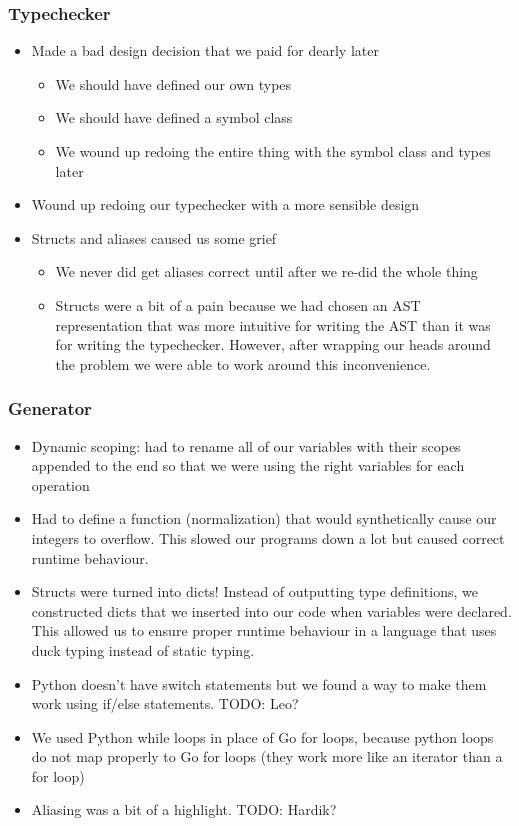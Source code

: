 \documentclass{article}
\begin{document}
\subsubsection{Typechecker}
\begin{itemize}
\item Made a bad design decision that we paid for dearly later
	\begin{itemize}
		\item We should have defined our own types
		\item We should have defined a symbol class
		\item We wound up redoing the entire thing with the symbol class and types later
	\end{itemize}
\item Wound up redoing our typechecker with a more sensible design
\item Structs and aliases caused us some grief
	\begin{itemize}
		\item We never did get aliases correct until after we re-did the whole thing
		\item Structs were a bit of a pain because we had chosen an AST representation that was more intuitive for writing the AST than it was for writing the typechecker. However, after wrapping our heads around the problem we were able to work around this inconvenience.
	\end{itemize}
\end{itemize}
\subsubsection{Generator}
\begin{itemize}
\item Dynamic scoping: had to rename all of our variables with their scopes appended to the end so that we were using the right variables for each operation
\item Had to define a function (normalization) that would synthetically cause our integers to overflow. This slowed our programs down a lot but caused correct runtime behaviour.
\item Structs were turned into dicts! Instead of outputting type definitions, we constructed dicts that we inserted into our code when variables were declared. This allowed us to ensure proper runtime behaviour in a language that uses duck typing instead of static typing.
\item Python doesn't have switch statements but we found a way to make them work using if/else statements. TODO: Leo?
\item We used Python while loops in place of Go for loops, because python loops do not map properly to Go for loops (they work more like an iterator than a for loop)
\item Aliasing was a bit of a highlight. TODO: Hardik?
\end{itemize}
\end{document}
